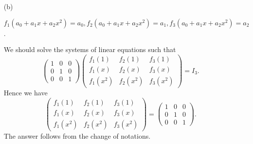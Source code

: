 \begin{Exercise}
\begin{enumerate}[(a)]
		\item[(b)]
		\begin{answer}
			$f_1(a_0+a_1 x+a_2 x^2) = a_0,f_2(a_0+a_1 x+a_2 x^2) = a_1,f_3(a_0+a_1 x+a_2 x^2) = a_2$.
		\end{answer}
		\begin{solution}
			We should solve the systems of linear equations such that
			$$
			\begin{pmatrix}
			1 & 0 & 0 \\
			0 & 1 & 0 \\
			0 & 0 & 1
			\end{pmatrix} \begin{pmatrix}
			f_1(1) & f_2(1) & f_3(1) \\
			f_1(x) & f_2(x) & f_3(x) \\
			f_1(x^2) & f_2(x^2) & f_3(x^2)
			\end{pmatrix} = I_3.
			$$
			Hence we have
			$$
			\begin{pmatrix}
			f_1(1) & f_2(1) & f_3(1) \\
			f_1(x) & f_2(x) & f_3(x) \\
			f_1(x^2) & f_2(x^2) & f_3(x^2)
			\end{pmatrix} = \begin{pmatrix}
			1 & 0 & 0 \\
			0 & 1 & 0 \\
			0 & 0 & 1
			\end{pmatrix}.
			$$
			The answer follows from the change of notations.
		\end{solution}
		
	\end{enumerate}
\end{Exercise}
